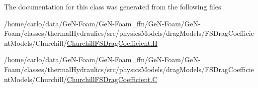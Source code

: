 The documentation for this class was generated from the following files\+:\begin{DoxyCompactItemize}
\item 
/home/carlo/data/\+Ge\+N-\/\+Foam/\+Ge\+N-\/\+Foam\+\_\+ffn/\+Ge\+N-\/\+Foam/\+Ge\+N-\/\+Foam/classes/thermal\+Hydraulics/src/physics\+Models/drag\+Models/\+F\+S\+Drag\+Coefficient\+Models/\+Churchill/\hyperlink{ChurchillFSDragCoefficient_8H}{Churchill\+F\+S\+Drag\+Coefficient.\+H}\item 
/home/carlo/data/\+Ge\+N-\/\+Foam/\+Ge\+N-\/\+Foam\+\_\+ffn/\+Ge\+N-\/\+Foam/\+Ge\+N-\/\+Foam/classes/thermal\+Hydraulics/src/physics\+Models/drag\+Models/\+F\+S\+Drag\+Coefficient\+Models/\+Churchill/\hyperlink{ChurchillFSDragCoefficient_8C}{Churchill\+F\+S\+Drag\+Coefficient.\+C}\end{DoxyCompactItemize}
